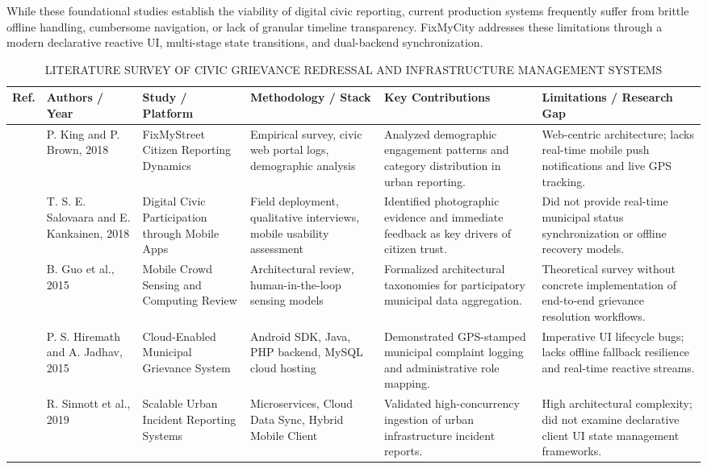 \documentclass[conference]{IEEEtran}
\renewcommand{\arraystretch}{1.15}
\begin{document}
While these foundational studies establish the viability of digital civic reporting, current production systems frequently suffer from brittle offline handling, cumbersome navigation, or lack of granular timeline transparency. FixMyCity addresses these limitations through a modern declarative reactive UI, multi-stage state transitions, and dual-backend synchronization.

\begin{table}[t]
\caption{LITERATURE SURVEY OF CIVIC GRIEVANCE REDRESSAL AND INFRASTRUCTURE MANAGEMENT SYSTEMS}
\centering
\scriptsize
\setlength{\tabcolsep}{3pt}
\renewcommand{\arraystretch}{1.15}
\begin{tabular}{|p{0.65cm}|p{2.35cm}|p{2.85cm}|p{3.25cm}|p{3.65cm}|p{3.65cm}|}
\hline
\textbf{Ref.} & \textbf{Authors / Year} & \textbf{Study / Platform} & \textbf{Methodology / Stack} & \textbf{Key Contributions} & \textbf{Limitations / Research Gap} \\
\hline
[1] & P. King and P. Brown, 2018 & FixMyStreet Citizen Reporting Dynamics & Empirical survey, civic web portal logs, demographic analysis & Analyzed demographic engagement patterns and category distribution in urban reporting. & Web-centric architecture; lacks real-time mobile push notifications and live GPS tracking. \\
\hline
[2] & T. S. E. Salovaara and E. Kankainen, 2018 & Digital Civic Participation through Mobile Apps & Field deployment, qualitative interviews, mobile usability assessment & Identified photographic evidence and immediate feedback as key drivers of citizen trust. & Did not provide real-time municipal status synchronization or offline recovery models. \\
\hline
[4] & B. Guo et al., 2015 & Mobile Crowd Sensing and Computing Review & Architectural review, human-in-the-loop sensing models & Formalized architectural taxonomies for participatory municipal data aggregation. & Theoretical survey without concrete implementation of end-to-end grievance resolution workflows. \\
\hline
[11] & P. S. Hiremath and A. Jadhav, 2015 & Cloud-Enabled Municipal Grievance System & Android SDK, Java, PHP backend, MySQL cloud hosting & Demonstrated GPS-stamped municipal complaint logging and administrative role mapping. & Imperative UI lifecycle bugs; lacks offline fallback resilience and real-time reactive streams. \\
\hline
[13] & R. Sinnott et al., 2019 & Scalable Urban Incident Reporting Systems & Microservices, Cloud Data Sync, Hybrid Mobile Client & Validated high-concurrency ingestion of urban infrastructure incident reports. & High architectural complexity; did not examine declarative client UI state management frameworks. \\
\hline
\end{tabular}
\label{tab:literature}
\end{table}
\end{document}
